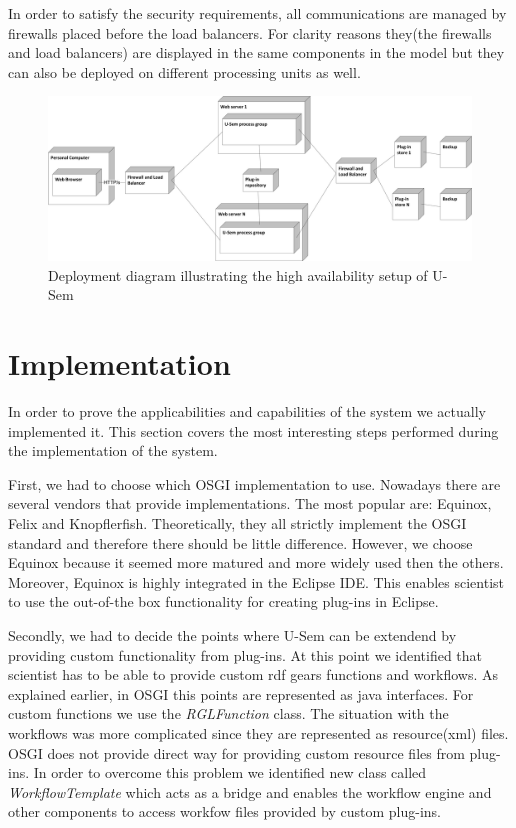In order to satisfy the security requirements, all communications are managed by firewalls placed before the load balancers. For clarity reasons they(the firewalls and load balancers) are displayed in the same components in the model but they can also be deployed on different processing units as well.


\begin{figure}[h!]
  \centering
  	\includegraphics[scale=0.70]{plug-in/layers/high_setup.png}
  \caption{Deployment diagram illustrating the high availability setup of U-Sem}
  \label{high_avail}
\end{figure}

\section{Implementation}

In order to prove the applicabilities and capabilities of the system we actually implemented it. This section covers the most interesting steps performed during the implementation of the system.

First, we had to choose which OSGI implementation to use. Nowadays there are several vendors that provide implementations. The most popular are: Equinox, Felix and Knopflerfish. Theoretically, they all strictly implement the OSGI standard and therefore there should be little difference. However, we choose Equinox because it seemed more matured and more widely used then the others. Moreover, Equinox is highly integrated in the Eclipse IDE. This enables scientist to use the out-of-the box functionality for creating plug-ins in Eclipse.

Secondly, we had to decide the points where U-Sem can be extendend by providing custom functionality from plug-ins. At this point we identified that scientist has to be able to provide custom rdf gears functions and workflows. As explained earlier, in OSGI this points are represented as java interfaces. For custom functions we use the \textit{RGLFunction} class. The situation with the workflows was more complicated since they are represented as resource(xml) files. OSGI does not provide direct way for providing custom resource files from plug-ins. In order to overcome this problem we identified new class called \textit{WorkflowTemplate} which acts as a bridge and enables the workflow engine and other components to access workfow files provided by custom plug-ins.

